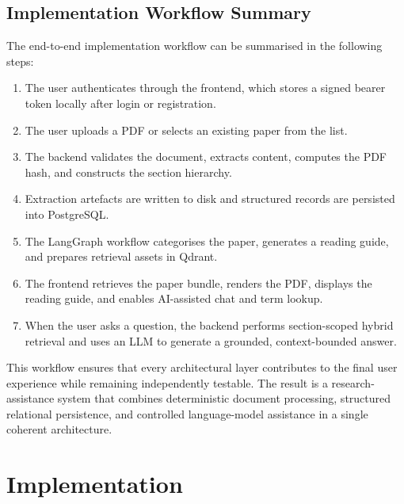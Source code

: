 \documentclass[12pt,a4paper]{report}
\begin{document}
\section{Implementation Workflow Summary}

The end-to-end implementation workflow can be summarised in the following steps:

\begin{enumerate}
    \item The user authenticates through the frontend, which stores a signed
    bearer token locally after login or registration.
    \item The user uploads a PDF or selects an existing paper from the list.
    \item The backend validates the document, extracts content, computes the PDF
    hash, and constructs the section hierarchy.
    \item Extraction artefacts are written to disk and structured records are
    persisted into PostgreSQL.
    \item The LangGraph workflow categorises the paper, generates a reading
    guide, and prepares retrieval assets in Qdrant.
    \item The frontend retrieves the paper bundle, renders the PDF, displays the
    reading guide, and enables AI-assisted chat and term lookup.
    \item When the user asks a question, the backend performs section-scoped
    hybrid retrieval and uses an LLM to generate a grounded, context-bounded
    answer.
\end{enumerate}

This workflow ensures that every architectural layer contributes to the final
user experience while remaining independently testable. The result is a
research-assistance system that combines deterministic document processing,
structured relational persistence, and controlled language-model assistance in a
single coherent architecture.



\chapter{Implementation}
\end{document}
